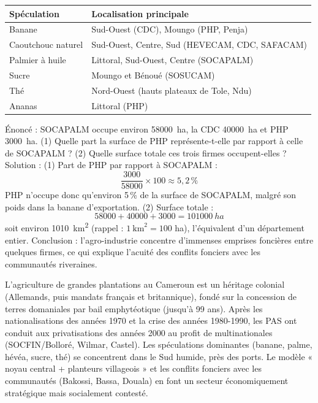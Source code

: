 \documentclass[11pt]{article}
\newcommand{\cle}[1]{{\popxbold\color{popdark}#1}}
\begin{document}
\begin{center}\begin{tabularx}{\linewidth}{|l|X|}\hline
\rowcolor{popblueL} \textbf{Spéculation} & \textbf{Localisation principale} \\ \hline
Banane & Sud-Ouest (CDC), Moungo (PHP, Penja) \\ \hline
Caoutchouc naturel & Sud-Ouest, Centre, Sud (HEVECAM, CDC, SAFACAM) \\ \hline
Palmier à huile & Littoral, Sud-Ouest, Centre (SOCAPALM) \\ \hline
Sucre & Moungo et Bénoué (SOSUCAM) \\ \hline
Thé & Nord-Ouest (hauts plateaux de Tole, Ndu) \\ \hline
Ananas & Littoral (PHP) \\ \hline
\end{tabularx}\end{center}

\begin{exoresolu}
Énoncé : SOCAPALM occupe environ \SI{58000}{ha}, la CDC \SI{40000}{ha} et PHP \SI{3000}{ha}. (1) Quelle part la surface de PHP représente-t-elle par rapport à celle de SOCAPALM ? (2) Quelle surface totale ces trois firmes occupent-elles ?
\tcblower
Solution : (1) Part de PHP par rapport à SOCAPALM :
\[ \frac{3000}{58000} \times 100 \approx 5,2\,\% \]
PHP n'occupe donc qu'environ 5\,\% de la surface de SOCAPALM, malgré son poids dans la banane d'exportation. (2) Surface totale :
\[ 58000 + 40000 + 3000 = \SI{101000}{ha} \]
soit environ \SI{1010}{km^2} (rappel : $1~\mathrm{km}^2 = 100$ ha), l'équivalent d'un département entier. Conclusion : l'agro-industrie concentre d'immenses emprises foncières entre quelques firmes, ce qui explique l'acuité des conflits fonciers avec les communautés riveraines.
\end{exoresolu}

\begin{aretenir}[L'essentiel]
L'agriculture de grandes plantations au Cameroun est un héritage colonial (Allemands, puis mandats français et britannique), fondé sur la \cle{concession} de terres domaniales par bail emphytéotique (jusqu'à 99 ans). Après les nationalisations des années 1970 et la crise des années 1980-1990, les PAS ont conduit aux privatisations des années 2000 au profit de multinationales (SOCFIN/Bolloré, Wilmar, Castel). Les spéculations dominantes (banane, palme, hévéa, sucre, thé) se concentrent dans le Sud humide, près des ports. Le modèle « noyau central + planteurs villageois » et les conflits fonciers avec les communautés (Bakossi, Bassa, Douala) en font un secteur économiquement stratégique mais socialement contesté.
\end{aretenir}
\end{document}
